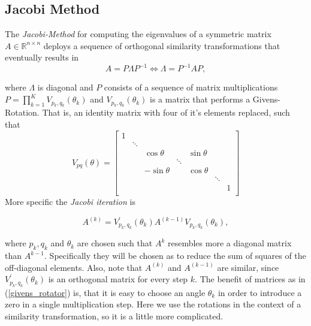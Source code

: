 \documentclass[12pt]{article}
\begin{document}
\subsection{Jacobi Method}

The \textit{Jacobi-Method} for computing the eigenvalues of a symmetric matrix $A \in \mathbb{R}^{n \times n}$ deploys a sequence of orthogonal similarity transformations that eventually results in
$$ A = P \Lambda P^{-1} \Leftrightarrow \Lambda = P^{-1} A P,$$

where $\Lambda$ is diagonal and $P$ consists of a sequence of matrix multiplications $P = \prod\limits_{k=1}^{K} V_{p_k, q_k}(\theta_k)$ and $V_{p_k, q_k}(\theta_k)$ is a matrix that performs a Givens-Rotation. That is, an identity matrix with four of it's elements replaced, such that
\small
\begin{equation}
\label{givens_rotator}
V_{pq}(\theta) = \begin{bmatrix}
                      1 \\
                        & \ddots \\
                        &        & \cos\theta    &        & \sin\theta  \\
                        &        &               & \ddots     \\
                        &        & -\sin\theta   &        & \cos\theta   \\
                        &        &               &        &            &  \ddots \\
                        &        &               &        &            &         & 1 \\
                 \end{bmatrix}
\end{equation}
\normalsize
\newpage
More specific the \textit{Jacobi iteration} is

\begin{equation}
A^{(k)} = V^{\prime}_{p_k, q_k}(\theta_k) A^{(k-1)} V_{p_k, q_k}(\theta_k),
\end{equation}

where $p_k, q_k$ and $\theta_k$ are chosen such that $A^{k}$ resembles more a diagonal matrix than $A^{k-1}$. Specifically they will be chosen as to reduce the sum of squares of the off-diagonal elements. Also, note that $A^{(k)}$ and $A^{(k-1)}$ are similar, since $V^{\prime}_{p_k, q_k}(\theta_k)$ is an orthogonal matrix for every step $k$. The benefit of matrices as in (\ref{givens_rotator}) is, that it is easy to choose an angle $\theta_k$ in order to introduce a zero in a single multiplication step. Here we use the rotations in the context of a similarity transformation, so it is a little more complicated.
\end{document}
